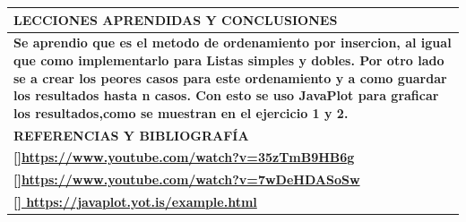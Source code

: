 \documentclass[9pt]{article}
\begin{document}
	\begin{table}[H]
		\begin{tabular}{|p{15cm}|}
			\hline 
			\rowcolor{tablebackground}
			\color{white}\textbf{LECCIONES APRENDIDAS Y CONCLUSIONES}  \\
			\hline 
			\textbf{Se aprendio que es el metodo de ordenamiento por insercion, 
				al igual que como implementarlo para Listas simples y dobles. Por otro lado se
				a crear los peores casos para este ordenamiento y a como guardar los resultados hasta n casos. Con esto se uso JavaPlot para graficar los resultados,como se muestran en el ejercicio 1 y 2.}  \\
		\hline 
		\rowcolor{tablebackground}
		\color{white}\textbf{REFERENCIAS Y BIBLIOGRAFÍA}  \\
		\hline 
		\textbf{[]\url{https://www.youtube.com/watch?v=35zTmB9HB6g}}\\
		\textbf{[]\url{https://www.youtube.com/watch?v=7wDeHDASoSw}}\\
		\textbf{[]\url{	https://javaplot.yot.is/example.html}}\\
	
		\hline 
	\end{tabular}
\end{table}
\end{document}
